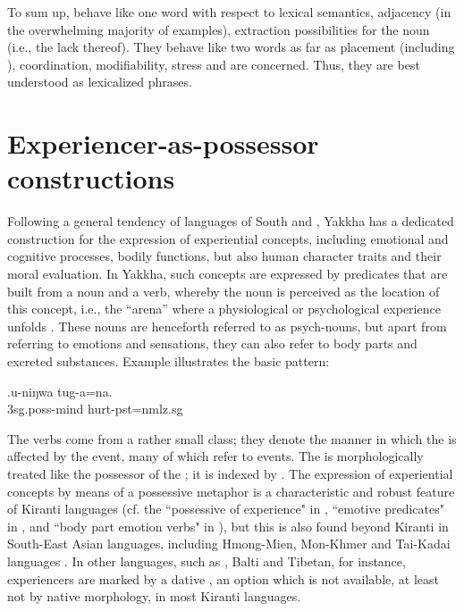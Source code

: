 To sum up,  behave like one word with respect to lexical semantics, adjacency (in the overwhelming majority of examples), extraction possibilities for the noun (i.e., the lack thereof). They behave like two words as far as  placement (including ), coordination, modifiability, stress and  are concerned. Thus, they are best understood as lexicalized phrases.


\section{Experiencer-as-possessor constructions}\label{nv-comp-poss}

Following a general tendency of languages of South and , Yakkha has a dedicated construction for the expression of experiential concepts, including emotional and cognitive processes, bodily functions, but also human character traits and their moral evaluation. In Yakkha, such concepts are expressed  by predicates that are built from a noun and a verb, whereby the noun is perceived as the location of this  concept, i.e., the “arena” where a physiological or psychological experience unfolds \citep[8]{Matisoff1986Hearts}. These nouns are henceforth referred to as psych-nouns, but apart from referring to emotions and sensations, they can also refer to body parts and excreted substances. Example \Next illustrates the basic pattern:

\exg.u-niŋwa tug-a=na.\\
{\sc 3sg.poss-}mind hurt{\sc [3sg]-pst=nmlz.sg}\\


The verbs come from a rather small class;  they denote the manner in which the  is affected by the event, many of which refer to  events. The  is morphologically treated like the possessor of the ; it is indexed by . The expression of experiential concepts by means of a possessive metaphor is a characteristic and robust feature of Kiranti languages (cf.  the “possessive of experience" in \citet{Bickel1997The-possessive}, “emotive predicates" in \citet[72]{Ebert1994The-structure},  and “body part emotion verbs" in \citealt[219]{Doornenbal2009A-grammar}), but this  is also found beyond Kiranti in  South-East Asian languages, including Hmong-Mien, Mon-Khmer and Tai-Kadai languages \citep{Matisoff1986Hearts, Bickel2004The-syntax}. In other  languages, such as , Balti and Tibetan, for instance, experiencers are marked by a dative \citep{Beyer1992_Tibetan, Genetti2007_Newari, Read1934Balti}, an option which is not available, at least not by native morphology, in most Kiranti languages.


